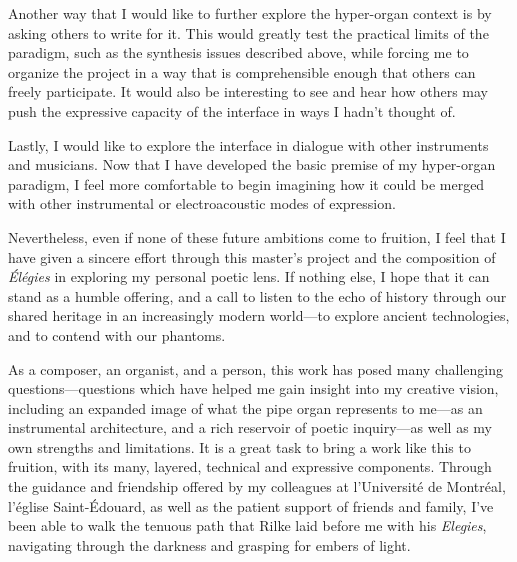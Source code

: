 \documentclass[12pt,twoside,maitrise]{dms_ks}
\theoremstyle{definition}
\begin{document}
{Another way that I would like to further explore the hyper-organ context is by asking others to write for it. 
This would greatly test the practical limits of the paradigm, such as the synthesis issues described above, while forcing me to organize the project in a way that is comprehensible enough that others can freely participate. 
It would also be interesting to see and hear how others may push the expressive capacity of the interface in ways I hadn't thought of.

Lastly, I would like to explore the interface in dialogue with other instruments and musicians. 
Now that I have developed the basic premise of my hyper-organ paradigm, I feel more comfortable to begin imagining how it could be merged with other instrumental or electroacoustic modes of expression.

Nevertheless, even if none of these future ambitions come to fruition, I feel that I have given a sincere effort through this master's project and the composition of \textit{Élégies} in exploring my personal poetic lens. 
If nothing else, I hope that it can stand as a humble offering, and a call to listen to the echo of history through our shared heritage in an increasingly modern world---to explore ancient technologies, and to contend with our phantoms.

As a composer, an organist, and a person, this work has posed many challenging questions---questions which have helped me gain insight into my creative vision, including an expanded image of what the pipe organ represents to me---as an instrumental architecture, and a rich reservoir of poetic inquiry---as well as my own strengths and limitations. 
It is a great task to bring a work like this to fruition, with its many, layered, technical and expressive components. 
Through the guidance and friendship offered by my colleagues at l'Université de Montréal, l'église Saint-Édouard, as well as the patient support of friends and family, I've been able to walk the tenuous path that Rilke laid before me with his \textit{Elegies}, navigating through the darkness and grasping for embers of light. 





}
\end{document}
